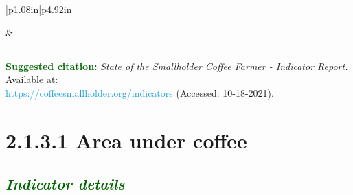 \documentclass[
]{article}
\begin{document}
\begin{longtable}[l]{|p{1.08in}|p{4.92in}}



 &  \\


\end{longtable}

\setcounter{tocdepth}{1}
\tableofcontents

\hypertarget{section}{%
\subsection{}\label{section}}

\textbf{\textcolor{darkgreen}{Suggested citation:}} \emph{State of the
Smallholder Coffee Farmer - Indicator Report.} Available at:\\
\textcolor[HTML]{159FDA}{https://coffeesmallholder.org/indicators}
(Accessed: 10-18-2021).

\pagebreak

\hypertarget{area-under-coffee}{%
\section{2.1.3.1 Area under coffee}\label{area-under-coffee}}

\hypertarget{section-1}{%
\subsection{\texorpdfstring{\textit{\textcolor{darkgreen}{Indicator details}}}{}}\label{section-1}}

\providecommand{\docline}[3]{\noalign{\global\setlength{\arrayrulewidth}{#1}}\arrayrulecolor[HTML]{#2}\cline{#3}}

\setlength{\tabcolsep}{2pt}

\renewcommand*{\arraystretch}{1.5}
\end{document}
